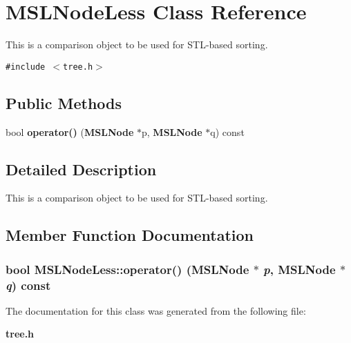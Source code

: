 \section{MSLNode\-Less  Class Reference}
\label{class_MSLNodeLess}
This is a comparison object to be used for STL-based sorting. 


{\tt \#include $<$tree.h$>$}

\subsection*{Public Methods}
\begin{CompactItemize}
\item 
bool {\bf operator()} ({\bf MSLNode} $\ast$p, {\bf MSLNode} $\ast$q) const
\end{CompactItemize}


\subsection{Detailed Description}
This is a comparison object to be used for STL-based sorting.



\subsection{Member Function Documentation}
\subsubsection{\setlength{\rightskip}{0pt plus 5cm}bool MSLNode\-Less::operator() ({\bf MSLNode} $\ast$ {\em p}, {\bf MSLNode} $\ast$ {\em q}) const\hspace{0.3cm}{\tt  [inline]}}\label{class_MSLNodeLess_a0}




The documentation for this class was generated from the following file:\begin{CompactItemize}
\item 
{\bf tree.h}\end{CompactItemize}
